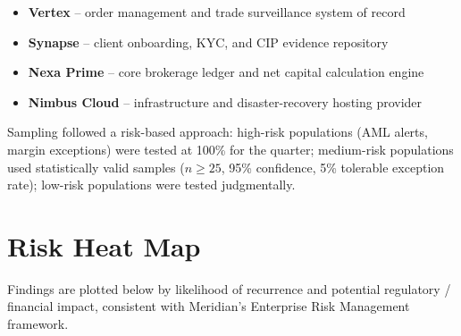 \documentclass[11pt,a4paper]{scrreprt}
\begin{document}
\begin{itemize}[leftmargin=1.4em,itemsep=2pt]
  \item[\faFile] \textbf{Vertex} -- order management and trade surveillance system of record
  \item[\faUsers] \textbf{Synapse} -- client onboarding, KYC, and CIP evidence repository
  \item[\faLock] \textbf{Nexa Prime} -- core brokerage ledger and net capital calculation engine
  \item[\faChartLine] \textbf{Nimbus Cloud} -- infrastructure and disaster-recovery hosting provider
\end{itemize}

Sampling followed a risk-based approach: high-risk populations (AML alerts, margin
exceptions) were tested at 100\% for the quarter; medium-risk populations used statistically
valid samples ($n \geq 25$, 95\% confidence, 5\% tolerable exception rate); low-risk
populations were tested judgmentally.

\section*{Risk Heat Map}

Findings are plotted below by likelihood of recurrence and potential regulatory / financial
impact, consistent with Meridian's Enterprise Risk Management framework.
\end{document}
